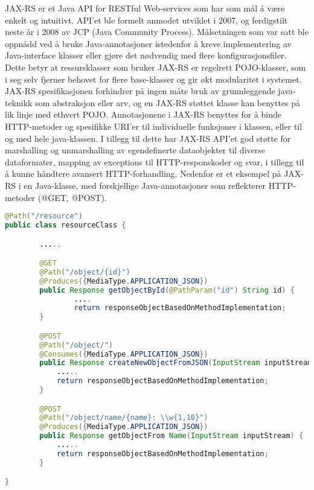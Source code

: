 \documentclass[../main.tex]{subfiles}
\begin{document}
JAX-RS er et Java API for RESTful Web-services som har som mål å være enkelt og intuitivt.  API’et ble formelt anmodet utviklet i 2007, og ferdigstilt neste år i 2008 av JCP (Java Community Process). Målsetningen som var satt ble oppnådd ved å bruke Java-annotasjoner istedenfor å kreve implementering av Java-interface klasser eller gjøre det nødvendig med flere konfigurasjonsfiler. Dette betyr at ressursklasser som bruker JAX-RS er regelrett POJO-klasser, som i seg selv fjerner behovet for flere base-klasser og gir økt modularitet i systemet. JAX-RS spesifikasjonen forhindrer på ingen måte bruk av grunnleggende java-teknikk som abstraksjon eller arv, og en JAX-RS støttet klasse kan benyttes på lik linje med ethvert POJO.\newline
\newline
Annotasjonene i JAX-RS benyttes for å binde HTTP-metoder og spesifikke URI’er til individuelle funksjoner i klassen, eller til og med hele java-klassen. I tillegg til dette har JAX-RS API’et god støtte for marshalling og unmarshalling av egendefinerte dataobjekter til diverse dataformater, mapping av exceptions til HTTP-responskoder og svar, i tillegg til å kunne håndtere avansert HTTP-forhandling.
Nedenfor er et eksempel på JAX-RS i en Java-klasse, med forskjellige Java-annotasjoner som reflekterer HTTP-metoder (@GET, @POST).

\begin{lstlisting}[language=Java, frame=single, caption={(Eksempel på REST-tjenester med JAX-RS)}]
@Path("/resource")
public class resourceClass {

        .....

        @GET
        @Path("/object/{id}")
        @Produces({MediaType.APPLICATION_JSON})
        public Response getObjectById(@PathParam("id") String id) {
                ....
                return responseObjectBasedOnMethodImplementation;
        }

        @POST
        @Path("/object/")
        @Consumes({MediaType.APPLICATION_JSON})
        public Response createNewObjectFromJSON(InputStream inputStream) {
            .....
            return responseObjectBasedOnMethodImplementation;
        }

        @POST
        @Path("/object/name/{name}: \\w{1,10}")
        @Produces({MediaType.APPLICATION_JSON})
        public Response getObjectFrom Name(InputStream inputStream) {
            .....
            return responseObjectBasedOnMethodImplementation;
        }

}
\end{lstlisting}
\end{document}
